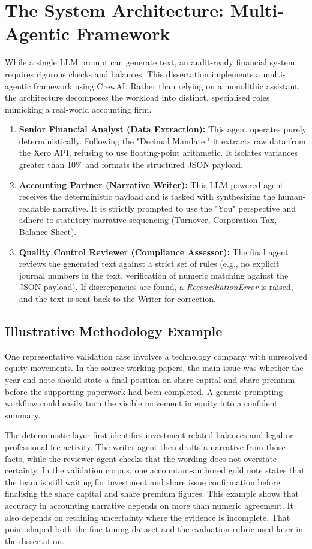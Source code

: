 \section{The System Architecture: Multi-Agentic Framework}
While a single LLM prompt can generate text, an audit-ready financial system requires rigorous checks and balances. This dissertation implements a multi-agentic framework using CrewAI. Rather than relying on a monolithic assistant, the architecture decomposes the workload into distinct, specialised roles mimicking a real-world accounting firm.

\begin{enumerate}
    \item \textbf{Senior Financial Analyst (Data Extraction):} This agent operates purely deterministically. Following the "Decimal Mandate," it extracts raw data from the Xero API, refusing to use floating-point arithmetic. It isolates variances greater than 10\% and formats the structured JSON payload.
    \item \textbf{Accounting Partner (Narrative Writer):} This LLM-powered agent receives the deterministic payload and is tasked with synthesizing the human-readable narrative. It is strictly prompted to use the "You" perspective and adhere to statutory narrative sequencing (Turnover, Corporation Tax, Balance Sheet).
    \item \textbf{Quality Control Reviewer (Compliance Assessor):} The final agent reviews the generated text against a strict set of rules (e.g., no explicit journal numbers in the text, verification of numeric matching against the JSON payload). If discrepancies are found, a \textit{ReconciliationError} is raised, and the text is sent back to the Writer for correction.
\end{enumerate}

\subsection{Illustrative Methodology Example}
One representative validation case involves a technology company with unresolved equity movements. In the source working papers, the main issue was whether the year-end note should state a final position on share capital and share premium before the supporting paperwork had been completed. A generic prompting workflow could easily turn the visible movement in equity into a confident summary.

The deterministic layer first identifies investment-related balances and legal or professional-fee activity. The writer agent then drafts a narrative from those facts, while the reviewer agent checks that the wording does not overstate certainty. In the validation corpus, one accountant-authored gold note states that the team is still waiting for investment and share issue confirmation before finalising the share capital and share premium figures. This example shows that accuracy in accounting narrative depends on more than numeric agreement. It also depends on retaining uncertainty where the evidence is incomplete. That point shaped both the fine-tuning dataset and the evaluation rubric used later in the dissertation.

